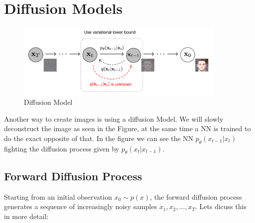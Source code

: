 \documentclass[a4paper]{article}
\begin{document}
\section{Diffusion Models}
\begin{figure}[h]
    \centering
    \includegraphics[width=0.9\textwidth]{images/diffusion.png}
    \caption{Diffusion Model}
    \label{fig:Diffusion Model}
\end{figure}
Another way to create images is using a diffusion Model. We will slowly deconstruct the image as seen in the Figure, at the same time a NN is trained to do the exact opposite of that. In the figure we can see the NN $p_{\theta}(x_{t-1}|x_t)$ fighting the diffusion process given by $p_{\theta}(x_t|x_{t-1})$. 
\subsection{Forward Diffusion Process}

Starting from an initial observation \( x_0 \sim p(x) \), the forward diffusion process generates a sequence of increasingly noisy samples \( x_1, x_2, \ldots, x_T \). Lets dicuss this in more detail: 
\end{document}

